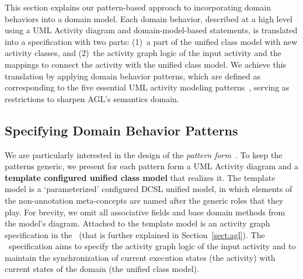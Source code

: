 This section explains our pattern-based approach to incorporating domain behaviors into a domain model. Each domain behavior, described at a high level using a UML Activity diagram and domain-model-based statements, is translated into a specification with two parts: (1)~a part of the unified class model with new activity classes, and (2)~the activity graph logic of the input activity and the mappings to connect the activity with the unified class model. We achieve this translation by applying domain behavior patterns, which are defined as corresponding to the five essential UML activity modeling patterns~\cite{le_domain_2018}, serving as restrictions to sharpen AGL's semantics domain.

\subsection{Specifying Domain Behavior Patterns}

We are particularly interested in the design of the \textit{pattern form}~\cite{riehle_understanding_1996, gamma_design_1994}. To keep the patterns generic, we present for each pattern form a UML Activity diagram and a \textbf{template configured unified class model} that realizes it. The template model is a `parameterized' configured DCSL unified model, in which elements of the non-annotation meta-concepts are named after the generic roles that they play. 
%
For brevity, we omit all associative fields and base domain methods from the model's diagram. 
%
Attached to the template model is an activity graph specification in the \agl~(that is further explained in Section~\ref{sect:agl}). The \agl~specification aims to specify the activity graph logic of the input activity and to maintain the synchronization of current execution states (\wrt the activity) with current states of the domain (\wrt the unified class model).

